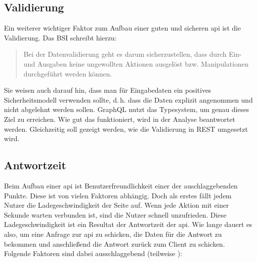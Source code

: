\subsection{Validierung}

Ein weiterer wichtiger Faktor zum Aufbau einer guten und sicheren \ac{api} ist die Validierung. Das \ac{BSI} schreibt hierzu:

\begin{quote}
\glqq Bei der Datenvalidierung geht es darum sicherzustellen, dass durch Ein- und Ausgaben keine ungewollten Aktionen ausgelöst bzw. Manipulationen durchgeführt werden können. \grqq \parencite{Bund2013}
\end{quote}

Sie weisen auch darauf hin, dass man für Eingabedaten ein positives Sicherheitsmodell verwenden sollte, d.\,h. dass die Daten explizit angenommen und nicht abgelehnt werden sollen.  \parencite{Bund2013} GraphQL nutzt das Typesystem, um genau dieses Ziel zu erreichen. Wie gut das funktioniert, wird in der Analyse beantwortet werden. Gleichzeitig soll gezeigt werden, wie die Validierung in \ac{REST} umgesetzt wird.

\subsection{Antwortzeit}\label{antwortzeit}

Beim Aufbau einer \ac{api} ist Benutzerfreundlichkeit einer der auschlaggebenden Punkte. Diese ist von vielen Faktoren abhängig. Doch als erstes fällt jedem Nutzer die Ladegeschwindigkeit der Seite auf.  Wenn jede Aktion mit einer Sekunde warten verbunden ist, sind die Nutzer schnell unzufrieden. Diese Ladegeschwindigkeit ist ein Resultat der Antwortzeit der \ac{api}. Wie lange dauert es also, um eine Anfrage zur \ac{api} zu schicken, die Daten für die Antwort zu bekommen und anschließend die Antwort zurück zum Client zu schicken. Folgende Faktoren sind dabei ausschlaggebend (teilweise \parencite{Rajak2017}):

